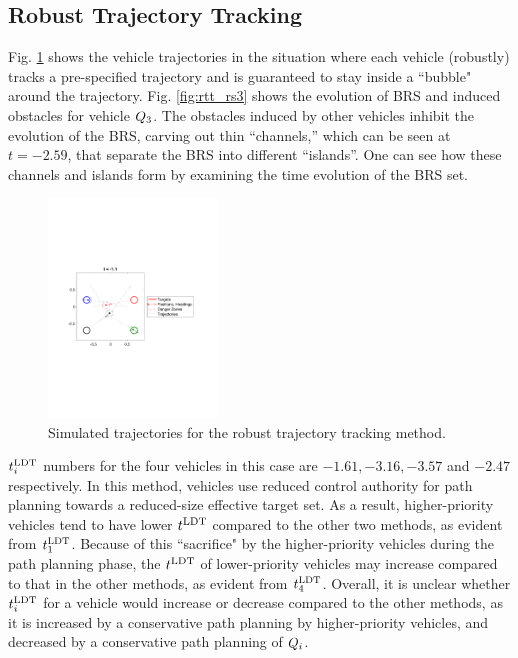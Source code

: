 \subsection{Robust Trajectory Tracking}
Fig. \ref{fig:rtt_traj} shows the vehicle trajectories in the situation where each vehicle (robustly) tracks a pre-specified trajectory and is guaranteed to stay inside a ``bubble" around the trajectory. Fig. \ref{fig:rtt_rs3} shows the evolution of BRS and induced obstacles for vehicle $Q_3$. The obstacles induced by other vehicles inhibit the evolution of the BRS, carving out thin “channels,” which can be seen at $t = -2.59$, that separate the BRS into different “islands”. One can see how these channels and islands form by examining the time evolution of the BRS set.

\begin{figure}
  \centering
  \includegraphics[width=0.40\textwidth]{"fig/rtt_traj"}
  \caption{Simulated trajectories for the robust trajectory tracking method.}
  \label{fig:rtt_traj}
  \vspace{-2em}
\end{figure}

$t^\text{LDT}_i$ numbers for the four vehicles in this case are $-1.61, -3.16, -3.57$ and $-2.47$ respectively. In this method, vehicles use reduced control authority for path planning towards a reduced-size effective target set. As a result, higher-priority vehicles tend to have lower $t^\text{LDT}$ compared to the other two methods, as evident from $t^\text{LDT}_1$. Because of this ``sacrifice" by the higher-priority vehicles during the path planning phase, the $t^\text{LDT}$ of lower-priority vehicles may increase compared to that in the other methods, as evident from $t^\text{LDT}_4$. Overall, it is unclear whether $t^\text{LDT}_i$ for a vehicle would increase or decrease compared to the other methods, as it is increased by a conservative path planning by higher-priority vehicles, and decreased by a conservative path planning of $Q_i$. 

